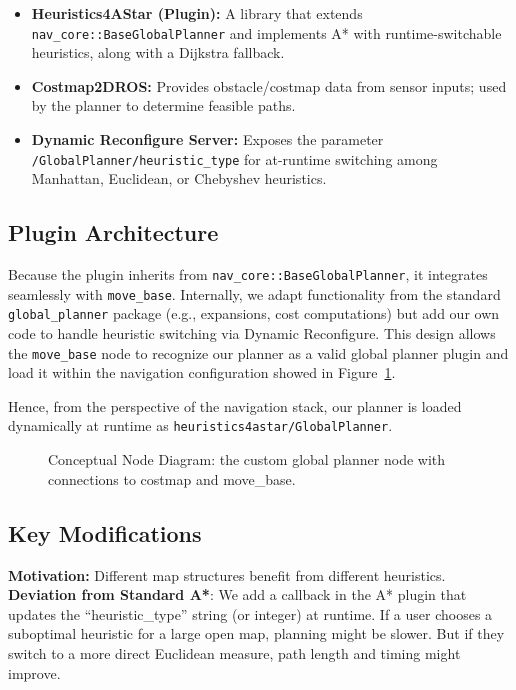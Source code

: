 \documentclass[letterpaper, 10 pt, conference]{ieeeconf}
\begin{document}
\begin{itemize}
    \item \textbf{Heuristics4AStar (Plugin):} A library that extends \texttt{nav\_core::BaseGlobalPlanner} and implements A* with runtime-switchable heuristics, along with a Dijkstra fallback.
    \item \textbf{Costmap2DROS:} Provides obstacle/costmap data from sensor inputs; used by the planner to determine feasible paths.
    \item \textbf{Dynamic Reconfigure Server:} Exposes the parameter \texttt{/GlobalPlanner/heuristic\_type} for at-runtime switching among Manhattan, Euclidean, or Chebyshev heuristics.
\end{itemize}

\subsection{Plugin Architecture}
Because the plugin inherits from \texttt{nav\_core::BaseGlobalPlanner}, it integrates seamlessly with \texttt{move\_base}. Internally, we adapt functionality from the standard \texttt{global\_planner} package (e.g., expansions, cost computations) but add our own code to handle heuristic switching via Dynamic Reconfigure. 
This design allows the \texttt{move\_base} node to recognize our planner as a valid global planner plugin and load it within the navigation configuration showed in
Figure~\ref{fig:rqt_graph}.

Hence, from the perspective of the navigation stack, our planner is loaded dynamically at runtime as \texttt{heuristics4astar/GlobalPlanner}.

\begin{figure}[!ht]
    \centering
    \caption{Conceptual Node Diagram: the custom global planner node 
    with connections to costmap and move\_base.}
    \label{fig:rqt_graph}
\end{figure}

\subsection{Key Modifications}
\textbf{Motivation:} 
Different map structures benefit from different heuristics.  
\textbf{Deviation from Standard A*}: 
We add a callback in the A* plugin that updates the “heuristic\_type” string 
(or integer) at runtime. If a user chooses a suboptimal heuristic for a large open map, planning might 
be slower. But if they switch to a more direct Euclidean measure, path length 
and timing might improve.
\end{document}
